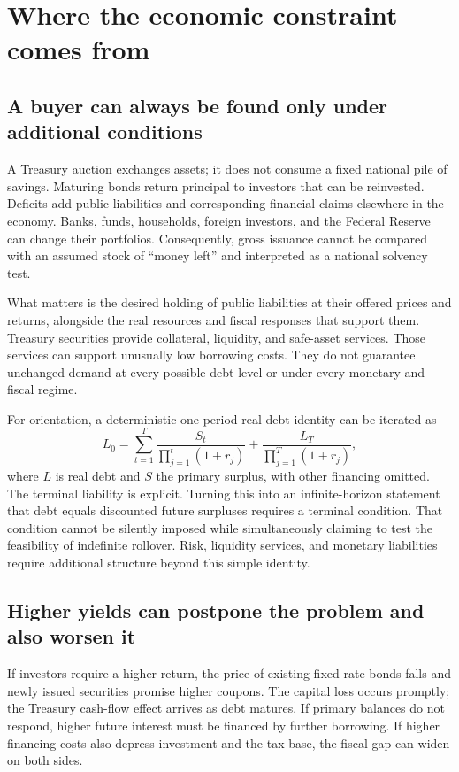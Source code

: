 \documentclass[11pt]{article}
\begin{document}
\section{Where the economic constraint comes from}

\subsection*{A buyer can always be found only under additional conditions}

A Treasury auction exchanges assets; it does not consume a fixed national pile of savings.
Maturing bonds return principal to investors that can be reinvested. Deficits add public
liabilities and corresponding financial claims elsewhere in the economy. Banks, funds,
households, foreign investors, and the Federal Reserve can change their portfolios.
Consequently, gross issuance cannot be compared with an assumed stock of ``money left''
and interpreted as a national solvency test.

What matters is the desired holding of public liabilities at their offered prices and
returns, alongside the real resources and fiscal responses that support them. Treasury
securities provide collateral, liquidity, and safe-asset services. Those services can
support unusually low borrowing costs. They do not guarantee unchanged demand at every
possible debt level or under every monetary and fiscal regime.

For orientation, a deterministic one-period real-debt identity can be iterated as
\[
L_0=\sum_{t=1}^{T}\frac{S_t}{\prod_{j=1}^{t}(1+r_j)}
       +\frac{L_T}{\prod_{j=1}^{T}(1+r_j)},
\]
where $L$ is real debt and $S$ the primary surplus, with other financing omitted.
The terminal liability is explicit. Turning this into an infinite-horizon statement that
debt equals discounted future surpluses requires a terminal condition. That condition
cannot be silently imposed while simultaneously claiming to test the feasibility of
indefinite rollover. Risk, liquidity services, and monetary liabilities require additional
structure beyond this simple identity.

\subsection*{Higher yields can postpone the problem and also worsen it}

If investors require a higher return, the price of existing fixed-rate bonds falls and
newly issued securities promise higher coupons. The capital loss occurs promptly; the
Treasury cash-flow effect arrives as debt matures. If primary balances do not respond,
higher future interest must be financed by further borrowing. If higher financing costs
also depress investment and the tax base, the fiscal gap can widen on both sides.
\end{document}
